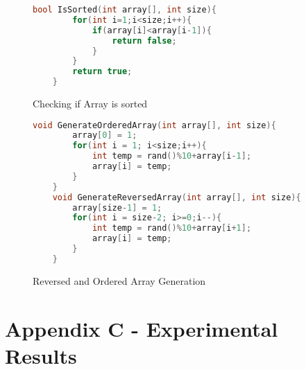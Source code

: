 \documentclass[]{article}
\begin{document}
\begin{figure}[H]\label{IsSorted}
	\caption{Checking if Array is sorted}
	\begin{lstlisting}[language=c++]
	bool IsSorted(int array[], int size){
		for(int i=1;i<size;i++){
			if(array[i]<array[i-1]){
				return false;
			}
		}
		return true;
	}
	\end{lstlisting}
\end{figure}
\begin{figure}[H]\label{ReversedOrdered}
	\caption{Reversed and Ordered Array Generation}
	\begin{lstlisting}[language=c++]
	void GenerateOrderedArray(int array[], int size){
		array[0] = 1;
		for(int i = 1; i<size;i++){
			int temp = rand()%10+array[i-1];
			array[i] = temp;
		}
	}
	void GenerateReversedArray(int array[], int size){
		array[size-1] = 1;
		for(int i = size-2; i>=0;i--){
			int temp = rand()%10+array[i+1];
			array[i] = temp;
		}
	}
	\end{lstlisting}
\end{figure}
\section{Appendix C - Experimental Results}


\end{document}
